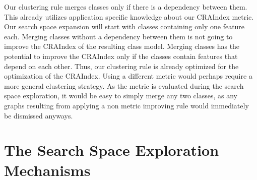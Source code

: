 \documentclass[a4paper]{article}
\begin{document}
Our clustering rule merges classes only if there is a dependency between them. 
This already utilizes application specific knowledge about our CRAIndex metric. Our 
search space expansion will start with classes containing only one feature each. Merging 
classes without a dependency between them is not going to improve the CRAIndex of 
the resulting class model. Merging classes has the potential to improve the CRAIndex only 
if the classes contain features that depend on each other. Thus, our clustering rule 
is already optimized for the optimization of the CRAIndex. Using a different metric would 
perhaps require a more general clustering strategy. As the metric is evaluated 
during the search space exploration, it would be easy to simply merge any two 
classes, as any graphs resulting from applying a non metric improving rule 
would immediately be dismissed anyways.


\section{The Search Space Exploration Mechanisms}
\label{sec:expansion}
\end{document}
